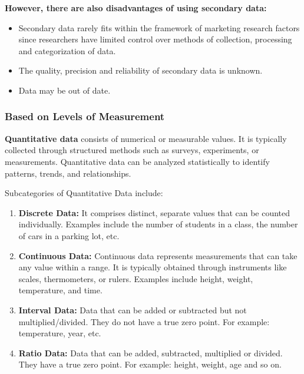 \documentclass{article}
\begin{document}
            \noindent \textbf{However, there are also disadvantages of using secondary data:}
            \begin{itemize}
                \item Secondary data rarely fits within the framework of marketing research factors since researchers have limited control over methods of collection, processing and categorization of data.
                \item The quality, precision and reliability of secondary data is unknown.
                \item Data may be out of date.
            \end{itemize}

            
            \subsubsection{Based on Levels of Measurement}

            \textbf{Quantitative data} consists of numerical or measurable values. It is typically collected through structured methods such as surveys, experiments, or measurements. Quantitative data can be analyzed statistically to identify patterns, trends, and relationships. \cite{statistics_nutshell}
            \bigskip
            
            \noindent Subcategories of Quantitative Data include:
            \begin{enumerate}
                \item \textbf{Discrete Data:} It comprises distinct, separate values that can be counted individually. Examples include the number of students in a class, the number of cars in a parking lot, etc.
        
                \item \textbf{Continuous Data:} Continuous data represents measurements that can take any value within a range. It is typically obtained through instruments like scales, thermometers, or rulers. Examples include height, weight, temperature, and time.
        
                \item \textbf{Interval Data:} Data that can be added or subtracted but not multiplied/divided. They do not have a true zero point. For example: temperature, year, etc.
                
                \item \textbf{Ratio Data:} Data that can be added, subtracted, multiplied or divided. They have a true zero point. For example: height, weight, age and so on.
            \end{enumerate}
\end{document}

